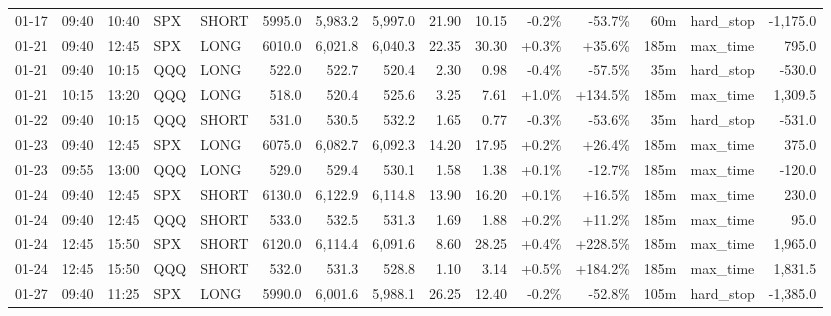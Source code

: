 \documentclass[11pt,a4paper,twoside]{article}
\begin{document}
\begin{landscape}
\begin{center}
\begin{longtable}{>{\color{txtmain}}l l l l l r r r r r r r r >{\color{txtmain}}l r}
01-17 & 09:40 & 10:40 & SPX & SHORT & 5995.0 & 5,983.2 & 5,997.0 & 21.90 & 10.15 & \textcolor{lossred}{-0.2\%} & \textcolor{lossred}{-53.7\%} & 60m & hard\_stop & \textcolor{lossred}{-1,175.0} \\
01-21 & 09:40 & 12:45 & SPX & LONG & 6010.0 & 6,021.8 & 6,040.3 & 22.35 & 30.30 & \textcolor{wingreen}{+0.3\%} & \textcolor{wingreen}{+35.6\%} & 185m & max\_time & \textcolor{wingreen}{795.0} \\
01-21 & 09:40 & 10:15 & QQQ & LONG & 522.0 & 522.7 & 520.4 & 2.30 & 0.98 & \textcolor{lossred}{-0.4\%} & \textcolor{lossred}{-57.5\%} & 35m & hard\_stop & \textcolor{lossred}{-530.0} \\
01-21 & 10:15 & 13:20 & QQQ & LONG & 518.0 & 520.4 & 525.6 & 3.25 & 7.61 & \textcolor{wingreen}{+1.0\%} & \textcolor{wingreen}{+134.5\%} & 185m & max\_time & \textcolor{wingreen}{1,309.5} \\
01-22 & 09:40 & 10:15 & QQQ & SHORT & 531.0 & 530.5 & 532.2 & 1.65 & 0.77 & \textcolor{lossred}{-0.3\%} & \textcolor{lossred}{-53.6\%} & 35m & hard\_stop & \textcolor{lossred}{-531.0} \\
01-23 & 09:40 & 12:45 & SPX & LONG & 6075.0 & 6,082.7 & 6,092.3 & 14.20 & 17.95 & \textcolor{wingreen}{+0.2\%} & \textcolor{wingreen}{+26.4\%} & 185m & max\_time & \textcolor{wingreen}{375.0} \\
01-23 & 09:55 & 13:00 & QQQ & LONG & 529.0 & 529.4 & 530.1 & 1.58 & 1.38 & \textcolor{wingreen}{+0.1\%} & \textcolor{lossred}{-12.7\%} & 185m & max\_time & \textcolor{lossred}{-120.0} \\
01-24 & 09:40 & 12:45 & SPX & SHORT & 6130.0 & 6,122.9 & 6,114.8 & 13.90 & 16.20 & \textcolor{wingreen}{+0.1\%} & \textcolor{wingreen}{+16.5\%} & 185m & max\_time & \textcolor{wingreen}{230.0} \\
01-24 & 09:40 & 12:45 & QQQ & SHORT & 533.0 & 532.5 & 531.3 & 1.69 & 1.88 & \textcolor{wingreen}{+0.2\%} & \textcolor{wingreen}{+11.2\%} & 185m & max\_time & \textcolor{wingreen}{95.0} \\
01-24 & 12:45 & 15:50 & SPX & SHORT & 6120.0 & 6,114.4 & 6,091.6 & 8.60 & 28.25 & \textcolor{wingreen}{+0.4\%} & \textcolor{wingreen}{+228.5\%} & 185m & max\_time & \textcolor{wingreen}{1,965.0} \\
01-24 & 12:45 & 15:50 & QQQ & SHORT & 532.0 & 531.3 & 528.8 & 1.10 & 3.14 & \textcolor{wingreen}{+0.5\%} & \textcolor{wingreen}{+184.2\%} & 185m & max\_time & \textcolor{wingreen}{1,831.5} \\
01-27 & 09:40 & 11:25 & SPX & LONG & 5990.0 & 6,001.6 & 5,988.1 & 26.25 & 12.40 & \textcolor{lossred}{-0.2\%} & \textcolor{lossred}{-52.8\%} & 105m & hard\_stop & \textcolor{lossred}{-1,385.0} \\

\end{longtable}
\end{center}
\end{landscape}
\end{document}

